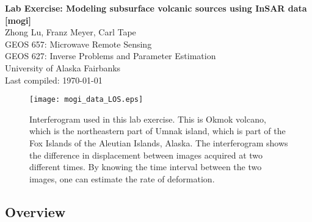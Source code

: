 \documentclass[11pt,titlepage,fleqn]{article}
\begin{document}

\begin{spacing}{1.2}
\centering
{\large \bf Lab Exercise: Modeling subsurface volcanic sources using InSAR data [mogi]} \\
Zhong Lu, Franz Meyer, Carl Tape %
\\
GEOS 657: Microwave Remote Sensing \\
GEOS 627: Inverse Problems and Parameter Estimation \\
University of Alaska Fairbanks \\
Last compiled: \today
\end{spacing}


\begin{figure}[h]
\centering
\texttt{[image: mogi\_data\_LOS.eps]}
\caption[]
{{
Interferogram used in this lab exercise. This is Okmok volcano, which is the northeastern part of Umnak island, which is part of the Fox Islands of the Aleutian Islands, Alaska. The interferogram shows the difference in displacement between images acquired at two different times. By knowing the time interval between the two images, one can estimate the rate of deformation.
\label{data}
}}
\end{figure}


\pagebreak
\subsection*{Overview}
\end{document}
